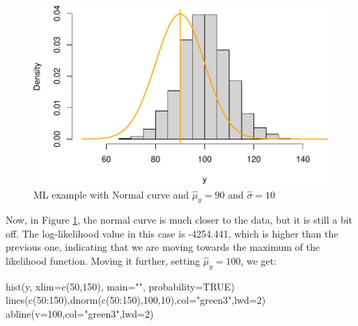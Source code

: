 \documentclass[
]{book}
\newenvironment{Shaded}{\begin{snugshade}}{\end{snugshade}}
\newcommand{\AttributeTok}[1]{\textcolor[rgb]{0.77,0.63,0.00}{#1}}
\newcommand{\ConstantTok}[1]{\textcolor[rgb]{0.00,0.00,0.00}{#1}}
\newcommand{\DecValTok}[1]{\textcolor[rgb]{0.00,0.00,0.81}{#1}}
\newcommand{\FunctionTok}[1]{\textcolor[rgb]{0.00,0.00,0.00}{#1}}
\newcommand{\NormalTok}[1]{#1}
\newcommand{\SpecialCharTok}[1]{\textcolor[rgb]{0.00,0.00,0.00}{#1}}
\newcommand{\StringTok}[1]{\textcolor[rgb]{0.31,0.60,0.02}{#1}}
\theoremstyle{definition}
\theoremstyle{definition}
\theoremstyle{definition}
\theoremstyle{definition}
\theoremstyle{remark}
\begin{document}
\begin{figure}
\centering
\includegraphics{Svetunkov---Statistics-for-Business-Analytics_files/figure-latex/MLENormalExample02-1.pdf}
\caption{\label{fig:MLENormalExample02}ML example with Normal curve and \(\hat{\mu}_y=90\) and \(\hat{\sigma}=10\)}
\end{figure}

Now, in Figure \ref{fig:MLENormalExample02}, the normal curve is much closer to the data, but it is still a bit off. The log-likelihood value in this case is -4254.441, which is higher than the previous one, indicating that we are moving towards the maximum of the likelihood function. Moving it further, setting \(\hat{\mu}_y=100\), we get:

\begin{Shaded}
\begin{Highlighting}[]
\FunctionTok{hist}\NormalTok{(y, }\AttributeTok{xlim=}\FunctionTok{c}\NormalTok{(}\DecValTok{50}\NormalTok{,}\DecValTok{150}\NormalTok{), }\AttributeTok{main=}\StringTok{""}\NormalTok{, }\AttributeTok{probability=}\ConstantTok{TRUE}\NormalTok{)}
\FunctionTok{lines}\NormalTok{(}\FunctionTok{c}\NormalTok{(}\DecValTok{50}\SpecialCharTok{:}\DecValTok{150}\NormalTok{),}\FunctionTok{dnorm}\NormalTok{(}\FunctionTok{c}\NormalTok{(}\DecValTok{50}\SpecialCharTok{:}\DecValTok{150}\NormalTok{),}\DecValTok{100}\NormalTok{,}\DecValTok{10}\NormalTok{),}\AttributeTok{col=}\StringTok{"green3"}\NormalTok{,}\AttributeTok{lwd=}\DecValTok{2}\NormalTok{)}
\FunctionTok{abline}\NormalTok{(}\AttributeTok{v=}\DecValTok{100}\NormalTok{,}\AttributeTok{col=}\StringTok{"green3"}\NormalTok{,}\AttributeTok{lwd=}\DecValTok{2}\NormalTok{)}
\end{Highlighting}
\end{Shaded}
\end{document}
